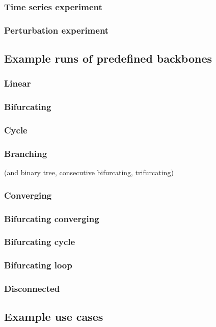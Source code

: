 \subsubsection{Time series experiment}
\blindtext

\subsubsection{Perturbation experiment}
\blindtext


\subsection{Example runs of predefined backbones}

\subsubsection{Linear}
\subsubsection{Bifurcating}
\subsubsection{Cycle}
\subsubsection{Branching} (and binary tree, consecutive bifurcating, trifurcating)
\subsubsection{Converging}
\subsubsection{Bifurcating converging}
\subsubsection{Bifurcating cycle}
\subsubsection{Bifurcating loop}
\subsubsection{Disconnected}

\subsection{Example use cases}
